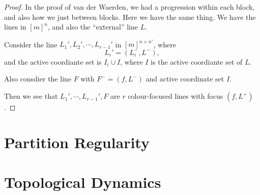 \documentclass[a4paper]{article}
\begin{document}
\begin{proof}
  In the proof of van der Waerden, we had a progression within each block, and also how we just between blocks. Here we have the same thing. We have the lines in $[m]^n$, and also the ``external'' line $L$.
  \begin{center}
  \end{center}
  Consider the line $L_1', L_2', \cdots, L_{r - 1}'$ in $[m]^{n + n'}$, where
  \[
    L_i' = (L_i^-, L^-),
  \]
  and the active coordiante set is $I_i \cup I$, where $I$ is the active coordiante set of $L$.

  Also consdier the line $F$ with $F^- = (f, L^-)$ and active coordinate set $I$.

  Then we see that $L_1', \cdots, L_{r - 1}', F$ are $r$ colour-focused lines with focus $(f, L^+)$.
\end{proof}

\section{Partition Regularity}
\section{Topological Dynamics}

\printindex
\end{document}
